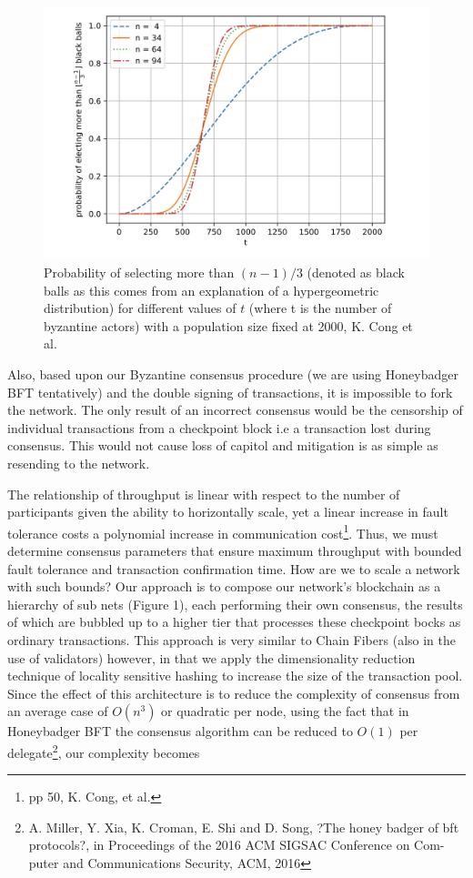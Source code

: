 \documentclass{article}
\begin{document}
\begin{figure}[H]
\centering
\includegraphics[scale=0.35]{fault-threshold-vs-byz-delegates.PNG}
\caption{Probability of selecting more than $(n-1)/3$ (denoted as black balls as this comes from an explanation of a hypergeometric distribution) for different values of $t$ (where t is the number of byzantine actors) with a population size fixed at 2000, K. Cong et al.}
\end{figure} 

Also, based upon our Byzantine consensus procedure (we are using Honeybadger BFT tentatively) and the double signing of transactions, it is impossible to fork the network. The only result of an incorrect consensus would be the censorship of individual transactions from a checkpoint block i.e a transaction lost during consensus. This would not cause loss of capitol and mitigation is as simple as resending to the network.

The relationship of throughput is linear with respect to the number of participants given the ability to horizontally scale, yet a linear increase in fault tolerance costs a polynomial increase in communication cost\footnote{pp 50, K. Cong, et al.}. Thus, we must determine consensus parameters that ensure maximum throughput with bounded fault tolerance and transaction confirmation time. How are we to scale a network with such bounds? Our approach is to compose our network's blockchain as a hierarchy of sub nets (Figure 1), each performing their own consensus, the results of which are bubbled up to a higher tier that processes these checkpoint bocks as ordinary transactions. This approach is very similar to Chain Fibers (also in the use of validators) however, in that we apply the dimensionality reduction technique of locality sensitive hashing to increase the size of the transaction pool. Since the effect of this architecture is to reduce the complexity of consensus from an average case  of $O(n^3)$ or quadratic per node, using the fact that in Honeybadger BFT the consensus algorithm can be reduced to $O(1)$ per delegate\footnote{A. Miller, Y. Xia, K. Croman, E. Shi and D. Song, ?The honey badger of bft protocols?, in Proceedings of the 2016 ACM SIGSAC Conference on Com- puter and Communications Security, ACM, 2016}, our complexity becomes
\end{document}
